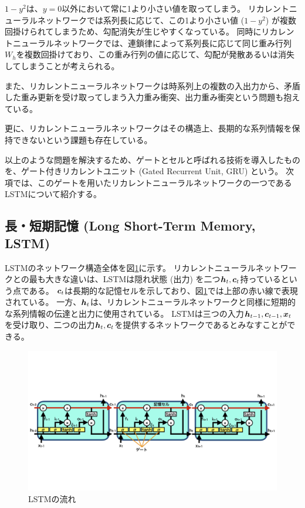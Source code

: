 $1-y^2$は、$y=0$以外において常に1より小さい値を取ってしまう。
リカレントニューラルネットワークでは系列長に応じて、この1より小さい値 ($1-y^2$) が複数回掛けられてしまうため、勾配消失が生じやすくなっている。
同時にリカレントニューラルネットワークでは、連鎖律によって系列長に応じて同じ重み行列$W_h$を複数回掛けており、この重み行列の値に応じて、勾配が発散あるいは消失してしまうことが考えられる。

また、リカレントニューラルネットワークは時系列上の複数の入出力から、矛盾した重み更新を受け取ってしまう入力重み衝突、出力重み衝突という問題も抱えている。

更に、リカレントニューラルネットワークはその構造上、長期的な系列情報を保持できないという課題も存在している。

以上のような問題を解決するため、ゲートとセルと呼ばれる技術を導入したものを、ゲート付きリカレントユニット (Gated Recurrent Unit, GRU\cite{GRU}) という。
次項では、このゲートを用いたリカレントニューラルネットワークの一つであるLSTMについて紹介する。


\subsection{長・短期記憶 (Long Short-Term Memory, LSTM)} \label{DL:RNN:LongShortTermMemory}

LSTMのネットワーク構造全体を図\ref{10LongShortTermMemory}に示す。
リカレントニューラルネットワークとの最も大きな違いは、LSTMは隠れ状態 (出力) を二つ${\mbox{\boldmath{$h$}}}_t,{\mbox{\boldmath{$c$}}}_t$持っているという点である。
${\mbox{\boldmath{$c$}}}_t$は長期的な記憶セルを示しており、図\ref{10LongShortTermMemory}では上部の赤い線で表現されている。
一方、${\mbox{\boldmath{$h$}}}_t$は、リカレントニューラルネットワークと同様に短期的な系列情報の伝達と出力に使用されている。
LSTMは三つの入力${\mbox{\boldmath{$h$}}}_{t-1},{\mbox{\boldmath{$c$}}}_{t-1},{\mbox{\boldmath{$x$}}}_t$を受け取り、二つの出力${\mbox{\boldmath{$h$}}}_t,{\mbox{\boldmath{$c$}}}_t$を提供するネットワークであるとみなすことができる。

\begin{figure}[h]
 \centering
 \includegraphics[trim = 0 200 0 200, width=1.0\textwidth, clip]{Figure/2DeepLearning/10LongShortTermMemory.png}
 \caption{LSTMの流れ}
 \label{10LongShortTermMemory}
\end{figure}


